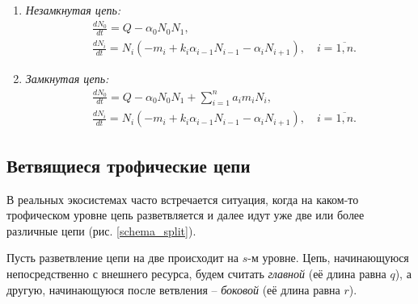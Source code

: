 \begin{enumerate}[label={\asbuk*)}, ref=\asbuk*]
    \item \textit{Незамкнутая цепь:}
    \begin{equation}  \label{flow}
        \begin{split}
            & \frac{dN_0}{dt} = Q - \alpha_0 N_0 N_1, \\
            & \frac{dN_i}{dt} = N_i (-m_i + k_i \alpha_{i-1} N_{i-1}  - \alpha_i N_{i+1}), \quad i=\overline{1,n}.
        \end{split}
    \end{equation}

    \item \textit{Замкнутая цепь:}
    \begin{equation} \label{cycle}
        \begin{split}
            & \frac{dN_0}{dt} = Q - \alpha_0 N_0 N_1  + \sum_{i=1}^{n} a_i m_i N_i, \\
            & \frac{dN_i}{dt} = N_i (-m_i + k_i \alpha_{i-1} N_{i-1}  - \alpha_i N_{i+1}), \quad i=\overline{1,n}.
        \end{split}
    \end{equation}
\end{enumerate}


\subsection{Ветвящиеся трофические цепи}
В реальных экосистемах часто встречается ситуация, когда на каком-то трофическом уровне цепь разветвляется и далее идут уже две или более различные цепи (рис. \ref{schema_split}). 

Пусть разветвление цепи на две происходит на \(s\)-м уровне. Цепь, начинающуюся непосредственно с внешнего ресурса, будем считать \textit{главной} (её длина равна \(q\)), а другую, начинающуюся после ветвления -- \textit{боковой} (её длина равна \(r\)).



